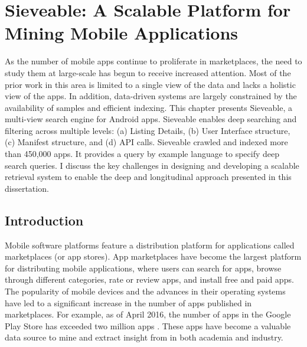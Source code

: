 \chapter{Sieveable: A Scalable Platform for Mining Mobile Applications}
\label{ch:sieveable_chapter}
As the number of mobile apps continue to proliferate in marketplaces, the need to study them at large-scale has begun to receive increased attention. 
Most of the prior work in this area is limited to a single view of the data  and lacks a  holistic view of the apps. 
In addition, data-driven systems are largely constrained by the availability of samples and efficient indexing.
This chapter presents Sieveable, a multi-view search engine for Android apps.
Sieveable enables deep searching and filtering across multiple levels: (a) Listing Details, (b) User Interface structure, (c) Manifest structure, and (d) API calls. 
Sieveable crawled and indexed more than 450,000 apps.
It provides a query by example language to specify deep search queries.
I discuss the key challenges in designing and developing a scalable retrieval system to enable the deep and longitudinal approach presented in this dissertation.

\section{Introduction}
Mobile software platforms feature a distribution platform for applications called marketplaces (or app stores).
App marketplaces have become the largest platform for distributing mobile applications, where users can search for apps, browse through different categories, rate or review apps, and install free and paid apps.
The popularity of mobile devices and the advances in their operating systems have led to a significant increase in the number of apps published in marketplaces.
For example, as of April 2016, the number of apps in the Google Play Store has exceeded two million apps \cite{appbrain_play_apps}.
These apps have become a valuable data source to mine and extract insight from in both academia and industry.

